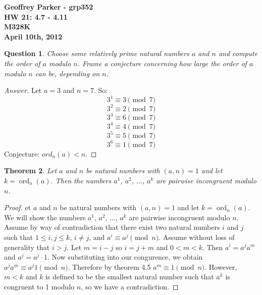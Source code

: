 \documentclass[12pt,leqno]{article}
\numberwithin{equation}{section}
\newtheorem{thm}{Theorem}[section]
\newtheorem{ques}[thm]{Question}
\theoremstyle{definition}
\newcommand{\ord}{\operatorname{ord}}
\begin{document}
\thispagestyle{plain}
\begin{flushright}
\large{\textbf{Geoffrey Parker - grp352 \\
HW 21: 4.7 - 4.11\\
M328K \\
April 10th, 2012 \\}}
\end{flushright}

\markboth{}{} \setcounter{section}{0} \baselineskip=18pt

\setcounter{tocdepth}{4}



\setcounter{section}{4}

\setcounter{thm}{6}


\begin{ques}
Choose some relatively prime natural numbers $a$ and $n$ and compute
the order of $a$ modulo $n$. Frame a conjecture concerning how large
the order of $a$ modulo $n$ can be, depending on $n$.
\end{ques}
\begin{proof}[Answer]
Let $a = 3$ and $n = 7$.  So:
\[3^1 \equiv 3 \pmod{7}\]
\[3^2 \equiv 2 \pmod{7}\]
\[3^3 \equiv 6 \pmod{7}\]
\[3^4 \equiv 4 \pmod{7}\]
\[3^5 \equiv 5 \pmod{7}\]
\[3^6 \equiv 1 \pmod{7}\]
Conjecture: $ord_n(a) < n$.
\end{proof}


\begin{thm}
Let $a$ and $n$ be natural numbers with $(a, n) = 1$ and let $k =
\ord_n(a)$.  Then the numbers $a^1$, $a^2$, $\dots$, $a^k$ are
pairwise incongruent modulo $n$.
\end{thm}
\begin{proof}[Proof]
et $a$ and $n$ be natural numbers with $(a, n) = 1$ and let $k = \ord_n(a)$.  We will show the numbers $a^1$, $a^2$, $\dots$, $a^k$ are pairwise incongruent modulo $n$.  Assume by way of contradiction that there exist two natural numbers $i$ and $j$ such that $1 \leq i, j \leq k$, $i \neq j$, and $a^i \equiv a^j \pmod{n}$.  Assume without loss of generality that $i > j$.  Let $m = i - j$ so $i = j + m$ and $0 < m < k$.  Then $a^i = a^ja^m$ and $a^j = a^j \cdot 1$.  Now substituting into our congurence, we obtain $a^ja^m \equiv a^j1 \pmod{n}$.  Therefore by theorem 4.5 $a^m \equiv 1 \pmod{n}$.  However, $m < k$ and $k$ is defined to be the smallest natural number such that $a^k$ is congruent to 1 modulo $n$, so we have a contradiction.
\end{proof}
\end{document}

